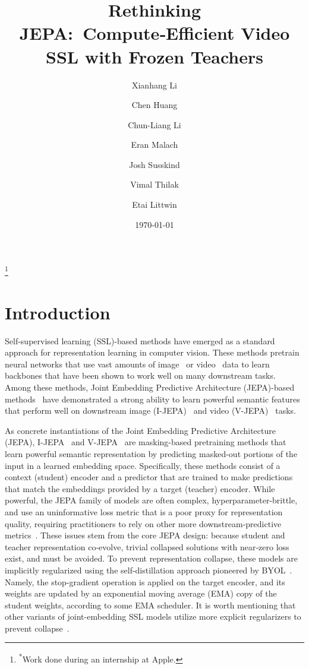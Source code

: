 \documentclass{applemlr}
\title{Rethinking JEPA:~Compute‑Efficient Video SSL with Frozen Teachers}
\author[*]{Xianhang Li}
\author{Chen Huang}
\author{Chun-Liang Li}
\author{Eran Malach}
\author{Josh Susskind}
\author{Vimal Thilak}
\author{Etai Littwin }
\affiliation{Apple}
\date{\sffamily\today}
\numberwithin{equation}{section}
\newcommand\blfootnote[1]{%
  \begin{NoHyper}%
  \renewcommand\thefootnote{}\footnote{#1}%
  \addtocounter{footnote}{-1}%
  \end{NoHyper}%
}
\begin{document}
\maketitle

\blfootnote{\textsuperscript{*}Work done during an internship at Apple.}

\section{Introduction}

Self-supervised learning (SSL)-based methods have emerged as a standard approach for representation learning in computer vision. These methods pretrain neural networks that use vast amounts of image~\citep{mae, ijepa, dino, dinov2_oquab2024, aim-el-nouby24a} or video~\citep{videomaev1_tong2022, videomaev2_wang2023_cvpr, bardes2024vjepa, assran2025vjepa2} data to learn backbones that have been shown to work well on many downstream tasks. Among these methods, Joint Embedding Predictive Architecture (JEPA)-based methods~\citep{lecun2022path} have demonstrated a strong ability to learn powerful semantic features that  perform well on downstream image (I-JEPA)~\citep{ijepa} and video (V-JEPA)~\citep{bardes2024vjepa, assran2025vjepa2} tasks.

As concrete instantiations of the Joint Embedding Predictive Architecture (JEPA), I-JEPA~\citep{ijepa} and V-JEPA~\citep{bardes2024vjepa, assran2025vjepa2} are masking-based pretraining methods that learn powerful semantic representation by predicting masked-out portions of the input in a learned embedding space. Specifically, these methods consist of a context (student) encoder and a predictor that are trained to make predictions that match the embeddings provided by a target (teacher) encoder. 
While powerful, the JEPA family of models are often complex, hyperparameter-brittle, and use an uninformative loss metric that is a poor proxy for representation quality, requiring practitioners to rely on other more downstream-predictive metrics~\citep{alphareq_agrawal2022, rankme_garrido, lidar_thilak}.  
These issues stem from the core JEPA design: because student and teacher representation co‑evolve, trivial collapsed solutions with near‑zero loss exist, and must be avoided. To prevent representation collapse, these models are implicitly regularized using the self-distillation approach pioneered by BYOL~\citep{byol}. Namely, the stop-gradient operation is applied on the target encoder, and its weights are updated by an exponential moving average (EMA) copy of the student weights, according to some EMA scheduler. It is worth mentioning that other variants of joint-embedding SSL models utilize more explicit regularizers to prevent collapse~\citep{BarlowTwins, vicreg}. \\
\end{document}
